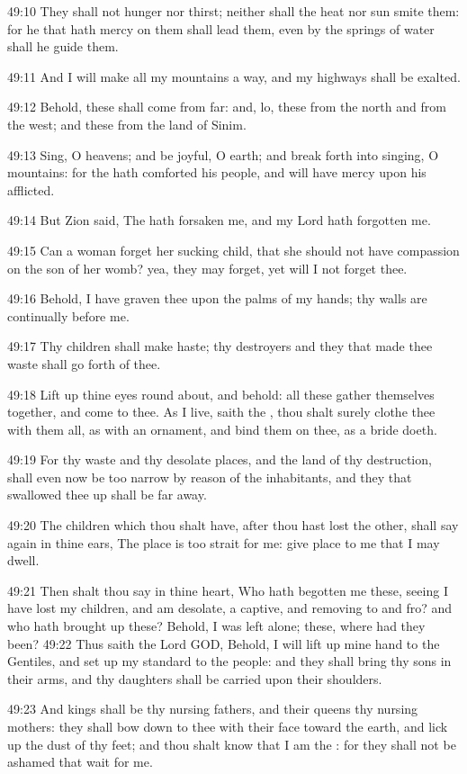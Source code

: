 49:10 They shall not hunger nor thirst; neither shall the heat nor sun
smite them: for he that hath mercy on them shall lead them, even by
the springs of water shall he guide them.

49:11 And I will make all my mountains a way, and my highways shall be
exalted.

49:12 Behold, these shall come from far: and, lo, these from the north
and from the west; and these from the land of Sinim.

49:13 Sing, O heavens; and be joyful, O earth; and break forth into
singing, O mountains: for the \LORD hath comforted his people, and will
have mercy upon his afflicted.

49:14 But Zion said, The \LORD hath forsaken me, and my Lord hath
forgotten me.

49:15 Can a woman forget her sucking child, that she should not have
compassion on the son of her womb? yea, they may forget, yet will I
not forget thee.

49:16 Behold, I have graven thee upon the palms of my hands; thy walls
are continually before me.

49:17 Thy children shall make haste; thy destroyers and they that made
thee waste shall go forth of thee.

49:18 Lift up thine eyes round about, and behold: all these gather
themselves together, and come to thee. As I live, saith the \LORD, thou
shalt surely clothe thee with them all, as with an ornament, and bind
them on thee, as a bride doeth.

49:19 For thy waste and thy desolate places, and the land of thy
destruction, shall even now be too narrow by reason of the
inhabitants, and they that swallowed thee up shall be far away.

49:20 The children which thou shalt have, after thou hast lost the
other, shall say again in thine ears, The place is too strait for me:
give place to me that I may dwell.

49:21 Then shalt thou say in thine heart, Who hath begotten me these,
seeing I have lost my children, and am desolate, a captive, and
removing to and fro? and who hath brought up these? Behold, I was left
alone; these, where had they been?  49:22 Thus saith the Lord GOD,
Behold, I will lift up mine hand to the Gentiles, and set up my
standard to the people: and they shall bring thy sons in their arms,
and thy daughters shall be carried upon their shoulders.

49:23 And kings shall be thy nursing fathers, and their queens thy
nursing mothers: they shall bow down to thee with their face toward
the earth, and lick up the dust of thy feet; and thou shalt know that
I am the \LORD: for they shall not be ashamed that wait for me.

